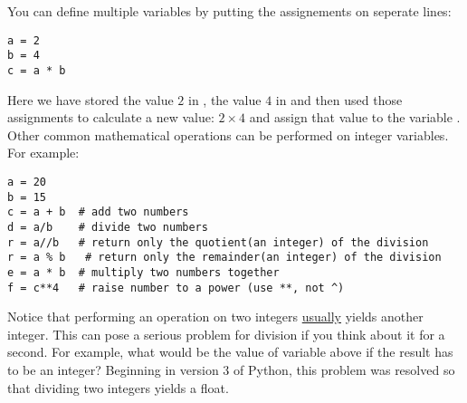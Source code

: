 You can define multiple variables by putting the assignements on
seperate lines:
\begin{Verbatim}
a = 2
b = 4
c = a * b
\end{Verbatim}
Here we have stored the value $2$ in , the value $4$ in
 and then used those assignments to calculate a new value: $ 2
\times 4$ and assign that value to the variable .
Other common mathematical operations can be performed on integer
variables.  For example:
\begin{Verbatim}
a = 20
b = 15
c = a + b  # add two numbers
d = a/b    # divide two numbers
r = a//b   # return only the quotient(an integer) of the division
r = a % b   # return only the remainder(an integer) of the division
e = a * b  # multiply two numbers together
f = c**4   # raise number to a power (use **, not ^)
\end{Verbatim}
Notice that performing an operation on two integers \ul{usually}
yields another integer.  This can pose a serious problem for division
if you think about it for a second. For example, what would be the
value of variable  above if the result has to be an integer?
Beginning in version 3 of Python, this problem was resolved so that
dividing two integers yields a float.

